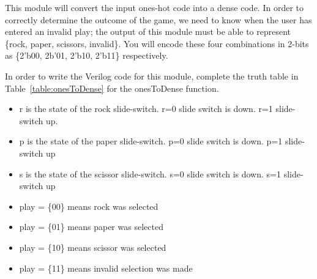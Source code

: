 This module will convert the input ones-hot code into a dense code. In
order to correctly determine the outcome of the game, we need to know
when the user has entered an invalid play; the output of this module
must be able to represent \{rock, paper, scissors, invalid\}. You will
encode these four combinations in 2-bits as \{2'b00, 2b'01, 2'b10,
2'b11\} respectively.

In order to write the Verilog code for this module, complete the truth
table in Table~\ref{table:onesToDense} for the onesToDense function.

\begin{itemize}
\item
  r is the state of the rock slide-switch. r=0 slide switch is down. r=1
  slide-switch up.
\item
  p is the state of the paper slide-switch. p=0 slide switch is down.
  p=1 slide-switch up
\item
  s is the state of the scissor slide-switch. s=0 slide switch is down.
  s=1 slide-switch up
\item
  play = \{00\} means rock was selected
\item
  play = \{01\} means paper was selected
\item
  play = \{10\} means scissor was selected
\item
  play = \{11\} means invalid selection was made
\end{itemize}

